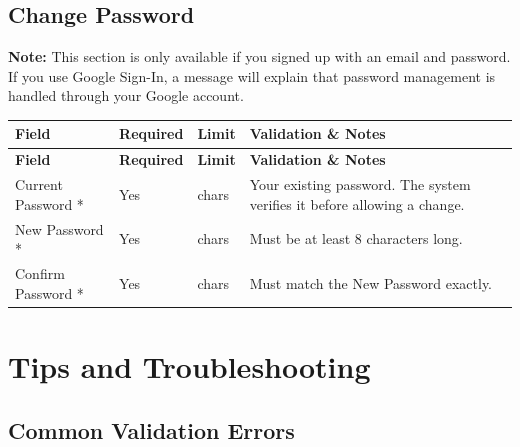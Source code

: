 \documentclass[12pt, a4paper]{article}
\newenvironment{fieldtable}{%
  \begin{longtable}{|>{\raggedright\arraybackslash}p{2.2cm}|>{\centering\arraybackslash}p{1.8cm}|>{\raggedright\arraybackslash}p{2.2cm}|>{\raggedright\arraybackslash}p{7.3cm}|}
  \hline
  \rowcolor{lightgray}
  \textbf{Field} & \textbf{Required} & \textbf{Limit} & \textbf{Validation \& Notes} \\
  \hline
  \endfirsthead
  \hline
  \rowcolor{lightgray}
  \textbf{Field} & \textbf{Required} & \textbf{Limit} & \textbf{Validation \& Notes} \\
  \hline
  \endhead
  \hline
  \endfoot
}{%
  \end{longtable}
}
\newcommand{\fieldrow}[4]{%
  #1 & #2 & #3 & #4 \\ \hline
}
\begin{document}
\subsection{Change Password}

\textbf{Note:} This section is only available if you signed up with an email and password. If you use Google Sign-In, a message will explain that password management is handled through your Google account.

\begin{fieldtable}
  \fieldrow{Current Password *}{Yes}{16 chars}{Your existing password. The system verifies it before allowing a change.}
  \fieldrow{New Password *}{Yes}{16 chars}{Must be at least 8 characters long.}
  \fieldrow{Confirm Password *}{Yes}{16 chars}{Must match the New Password exactly.}
\end{fieldtable}

\newpage
\section{Tips and Troubleshooting}

\subsection{Common Validation Errors}
\end{document}
